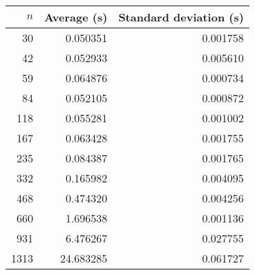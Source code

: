 \begin{tabular}{rrr}
$n$ & Average (s) & Standard deviation (s)\\\hline
30 & 0.050351 & 0.001758\\
42 & 0.052933 & 0.005610\\
59 & 0.064876 & 0.000734\\
84 & 0.052105 & 0.000872\\
118 & 0.055281 & 0.001002\\
167 & 0.063428 & 0.001755\\
235 & 0.084387 & 0.001765\\
332 & 0.165982 & 0.004095\\
468 & 0.474320 & 0.004256\\
660 & 1.696538 & 0.001136\\
931 & 6.476267 & 0.027755\\
1313 & 24.683285 & 0.061727\\
\end{tabular}
